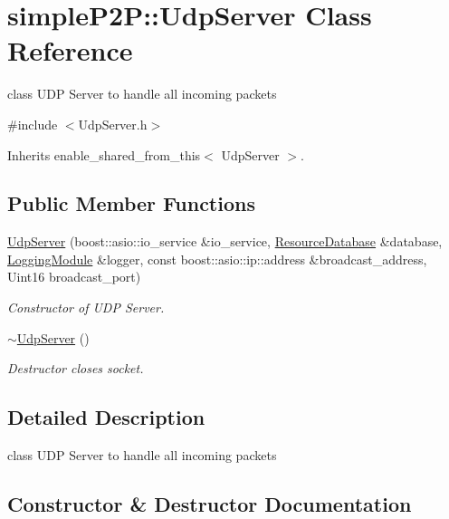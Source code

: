 \hypertarget{classsimpleP2P_1_1UdpServer}{}\section{simple\+P2P\+:\+:Udp\+Server Class Reference}
\label{classsimpleP2P_1_1UdpServer}


class U\+DP Server to handle all incoming packets  




{\ttfamily \#include $<$Udp\+Server.\+h$>$}



Inherits enable\+\_\+shared\+\_\+from\+\_\+this$<$ Udp\+Server $>$.

\subsection*{Public Member Functions}
\begin{DoxyCompactItemize}
\item 
\hyperlink{classsimpleP2P_1_1UdpServer_a039f3c0c5d6fc0ff9814ced9f03940f6}{Udp\+Server} (boost\+::asio\+::io\+\_\+service \&io\+\_\+service, \hyperlink{classsimpleP2P_1_1ResourceDatabase}{Resource\+Database} \&database, \hyperlink{classsimpleP2P_1_1LoggingModule}{Logging\+Module} \&logger, const boost\+::asio\+::ip\+::address \&broadcast\+\_\+address, Uint16 broadcast\+\_\+port)
\begin{DoxyCompactList}\small\item\em Constructor of U\+DP Server. \end{DoxyCompactList}\item 
\mbox{\label{classsimpleP2P_1_1UdpServer_a3cb39f3b37b96574549cb7c2e9015836}} 
\hyperlink{classsimpleP2P_1_1UdpServer_a3cb39f3b37b96574549cb7c2e9015836}{$\sim$\+Udp\+Server} ()
\begin{DoxyCompactList}\small\item\em Destructor closes socket. \end{DoxyCompactList}\end{DoxyCompactItemize}


\subsection{Detailed Description}
class U\+DP Server to handle all incoming packets 

\subsection{Constructor \& Destructor Documentation}
\mbox{\label{classsimpleP2P_1_1UdpServer_a039f3c0c5d6fc0ff9814ced9f03940f6}} 
